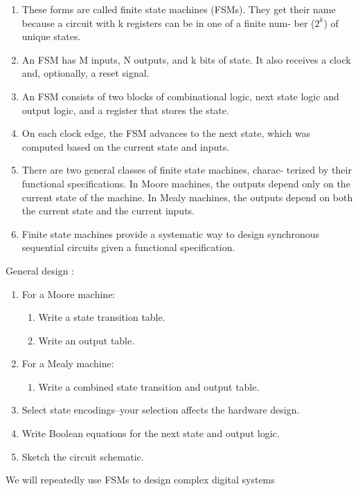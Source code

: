 \documentclass{article}[12pt]
\begin{document}
\begin{enumerate}
  \item These forms are called finite state machines (FSMs). They get
  their name because a circuit with k registers can be in one of a finite num-
  ber ($2^k$) of unique states.
  \item An FSM has M inputs, N outputs, and k bits of
  state. It also receives a clock and, optionally, a reset signal.
  \item An FSM consists of two blocks of combinational logic, next state logic and output
  logic, and a register that stores the state.
  \item On each clock edge, the FSM advances to the next state, which was computed based on the current state
  and inputs.
  \item There are two general classes of finite state machines, charac-
  terized by their functional specifications. In Moore machines, the outputs
  depend only on the current state of the machine. In Mealy machines, the
  outputs depend on both the current state and the current inputs.
  \item Finite state machines provide a systematic way to design synchronous sequential
  circuits given a functional specification.
\end{enumerate}

General design : 
\begin{enumerate}
  \item For a Moore machine:
  \begin{enumerate}
    \item Write a state transition table.
    \item Write an output table.
  \end{enumerate}
  \item For a Mealy machine:
  \begin{enumerate}
    \item Write a combined state transition and output table.
  \end{enumerate}
  \item Select state encodings--your selection affects the hardware design.
  \item Write Boolean equations for the next state and output logic.
  \item Sketch the circuit schematic.
\end{enumerate}
We will repeatedly use FSMs to design complex digital systems
\end{document}
